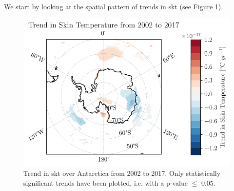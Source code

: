 \documentclass[../main.tex]{subfiles}
\begin{document}
We start by looking at the spatial pattern of trends in \gls{skt} (see Figure \ref{fig:trend_skt_02_17}).
\begin{figure}[hbt!]
    \centering
    \includegraphics{images/2021w5/chapter7/hres/trend_spatial_skt}
    \caption{Trend in \gls{skt} over Antarctica from 2002 to 2017. Only statistically significant trends have been plotted, i.e. with a p-value $\leq$ 0.05.}
    \label{fig:trend_skt_02_17}
\end{figure}
\end{document}
